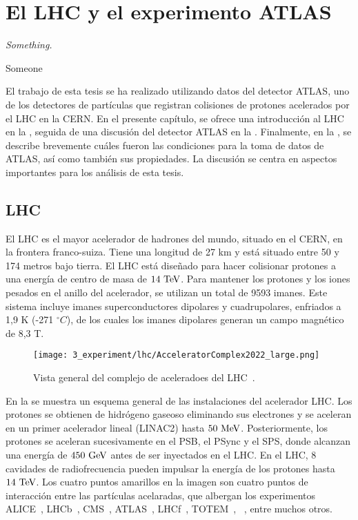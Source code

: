 \chapter{El LHC y el experimento ATLAS}
\label{ch:atlas}

\epigraph{\emph{Something.}}{Someone}

El trabajo de esta tesis se ha realizado utilizando datos del detector \ac{ATLAS}, uno de los detectores de partículas que registran colisiones de protones acelerados por el \acf{LHC} en la \ac{CERN}.
En el presente capítulo, se ofrece una introducción al \ac{LHC} en la \Sect{\ref{sec:atlas:LHC}}, seguida de una discusión del detector \ac{ATLAS} en la \Sect{\ref{sec:atlas:atlas}}. Finalmente, en la \Sect{\ref{sec:atlas:runs}}, se describe brevemente cu\'ales fueron las condiciones para la toma de datos de \ac{ATLAS}, as\'i como tambi\'en sus propiedades. La discusión se centra en aspectos importantes para los análisis de esta tesis.




\section{LHC}
\label{sec:atlas:LHC}

El \ac{LHC} \cite{LHC-TDR,LHC-Machine} es el mayor acelerador de hadrones del mundo, situado en el \ac{CERN}, en la frontera franco-suiza. Tiene una longitud de 27 km y está situado entre 50 y 174 metros bajo tierra.
El \ac{LHC} está diseñado para hacer colisionar protones a una energía de centro de masa de \(14~\text{TeV}\). Para mantener los protones y los iones pesados en el anillo del acelerador, se utilizan un total de 9593 imanes. Este sistema incluye imanes superconductores dipolares y cuadrupolares, enfriados a 1,9 K (-271 $^{\circ} C$), de los cuales los imanes dipolares generan un campo magnético de 8,3 T.

\begin{figure}[ht!]
    \centering
    \texttt{[image: 3\_experiment/lhc/AcceleratorComplex2022\_large.png]}
    \caption{Vista general del complejo de aceleradoes del \ac{LHC}~\cite{LHC-complex}.}
    \label{fig:atlas:lhc:lhc}
\end{figure}

En la \Fig{\ref{fig:atlas:lhc:lhc}} se muestra un esquema general de las instalaciones del acelerador \ac{LHC}. Los protones se obtienen de hidrógeno gaseoso eliminando sus electrones y se aceleran en un primer acelerador lineal (LINAC2) hasta \(50~\text{MeV}\). Posteriormente, los protones se aceleran sucesivamente en el \ac{PSB}, el \ac{PSync} y el \ac{SPS}, donde alcanzan una energía de \(450~\text{GeV}\) antes de ser inyectados en el \ac{LHC}. En el \ac{LHC}, 8 cavidades de radiofrecuencia pueden impulsar la energía de los protones hasta \(14~\text{TeV}\). Los cuatro puntos amarillos en la imagen \Fig{\ref{fig:atlas:lhc:lhc}} son cuatro puntos de interacción entre las part\'iculas acelaradas, que albergan los experimentos \ac{ALICE}~\cite{ALICE}, \acs{LHCb}~\cite{LHCb}, \acs{CMS}~\cite{CMS}, \acs{ATLAS}~\cite{ATLAS}, \acs{LHCf}~\cite{LHCf}, \acs{TOTEM}~\cite{TOTEM}, ~\cite{MoEDAL}, entre muchos otros.

